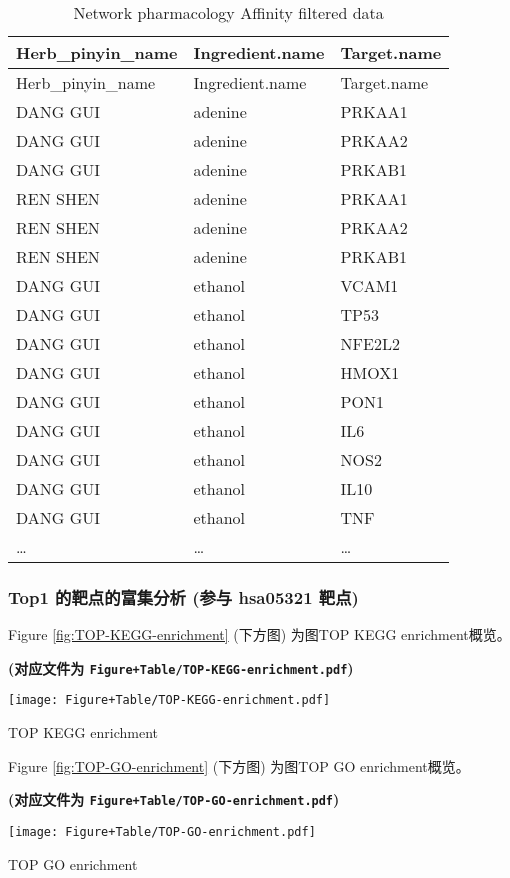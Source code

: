 \documentclass[
]{article}
\begin{document}
\begin{longtable}[]{@{}lll@{}}
\caption{\label{tab:Network-pharmacology-Affinity-filtered-data}Network pharmacology Affinity filtered data}\tabularnewline
\toprule
Herb\_pinyin\_name & Ingredient.name & Target.name\tabularnewline
\midrule
\endfirsthead
\toprule
Herb\_pinyin\_name & Ingredient.name & Target.name\tabularnewline
\midrule
\endhead
DANG GUI & adenine & PRKAA1\tabularnewline
DANG GUI & adenine & PRKAA2\tabularnewline
DANG GUI & adenine & PRKAB1\tabularnewline
REN SHEN & adenine & PRKAA1\tabularnewline
REN SHEN & adenine & PRKAA2\tabularnewline
REN SHEN & adenine & PRKAB1\tabularnewline
DANG GUI & ethanol & VCAM1\tabularnewline
DANG GUI & ethanol & TP53\tabularnewline
DANG GUI & ethanol & NFE2L2\tabularnewline
DANG GUI & ethanol & HMOX1\tabularnewline
DANG GUI & ethanol & PON1\tabularnewline
DANG GUI & ethanol & IL6\tabularnewline
DANG GUI & ethanol & NOS2\tabularnewline
DANG GUI & ethanol & IL10\tabularnewline
DANG GUI & ethanol & TNF\tabularnewline
\ldots{} & \ldots{} & \ldots{}\tabularnewline
\bottomrule
\end{longtable}

\hypertarget{top1-ux7684ux9776ux70b9ux7684ux5bccux96c6ux5206ux6790-ux53c2ux4e0e-hsa05321-ux9776ux70b9}{%
\subsubsection{Top1 的靶点的富集分析 (参与 hsa05321 靶点)}\label{top1-ux7684ux9776ux70b9ux7684ux5bccux96c6ux5206ux6790-ux53c2ux4e0e-hsa05321-ux9776ux70b9}}

Figure \ref{fig:TOP-KEGG-enrichment} (下方图) 为图TOP KEGG enrichment概览。

\textbf{(对应文件为 \texttt{Figure+Table/TOP-KEGG-enrichment.pdf})}

\def\@captype{figure}
\begin{center}
\texttt{[image: Figure+Table/TOP-KEGG-enrichment.pdf]}
\caption{TOP KEGG enrichment}\label{fig:TOP-KEGG-enrichment}
\end{center}

Figure \ref{fig:TOP-GO-enrichment} (下方图) 为图TOP GO enrichment概览。

\textbf{(对应文件为 \texttt{Figure+Table/TOP-GO-enrichment.pdf})}

\def\@captype{figure}
\begin{center}
\texttt{[image: Figure+Table/TOP-GO-enrichment.pdf]}
\caption{TOP GO enrichment}\label{fig:TOP-GO-enrichment}
\end{center}
\end{document}
